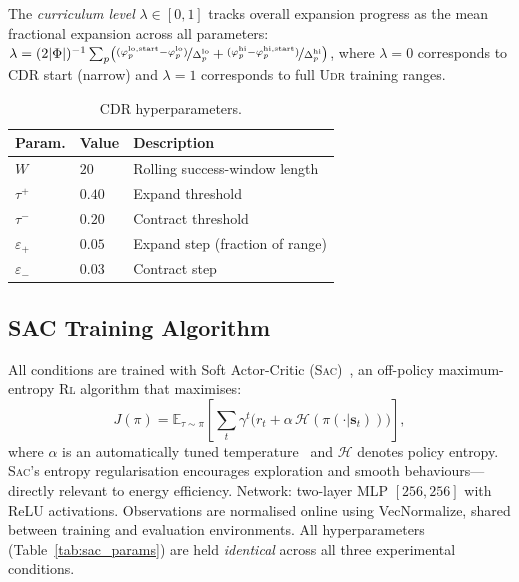 \documentclass[letterpaper,10pt,journal]{IEEEtran}
\newcommand{\UDR}{\textsc{Udr}\xspace}
\newcommand{\SAC}{\textsc{Sac}\xspace}
\newcommand{\RL}{\textsc{Rl}\xspace}
\begin{document}
The \emph{curriculum level} $\lambda\in[0,1]$ tracks overall expansion
progress as the mean fractional expansion across all parameters:
$\lambda = (2|\Phi|)^{-1}\sum_p\bigl(\nicefrac{(\varphi_p^\mathrm{lo,start}
-\varphi_p^\mathrm{lo})}{\Delta_p^\mathrm{lo}}
+\nicefrac{(\varphi_p^\mathrm{hi}-\varphi_p^\mathrm{hi,start})}
{\Delta_p^\mathrm{hi}}\bigr)$,
where $\lambda=0$ corresponds to CDR start (narrow) and $\lambda=1$
corresponds to full \UDR training ranges.

\begin{table}[!t]
  \centering
  \caption{CDR hyperparameters.}
  \label{tab:cdr_params}
  \renewcommand{\arraystretch}{1.15}
  \begin{tabular}{llp{4.0cm}}
    \toprule
    \textbf{Param.} & \textbf{Value} & \textbf{Description} \\
    \midrule
    $W$             & $20$   & Rolling success-window length \\
    $\tau^+$        & $0.40$ & Expand threshold \\
    $\tau^-$        & $0.20$ & Contract threshold \\
    $\varepsilon_+$ & $0.05$ & Expand step (fraction of range) \\
    $\varepsilon_-$ & $0.03$ & Contract step \\
    \bottomrule
  \end{tabular}
\end{table}

\subsection{SAC Training Algorithm}

All conditions are trained with Soft Actor-Critic (\SAC)~\cite{haarnoja2018},
an off-policy maximum-entropy \RL algorithm that maximises:
\begin{equation}
  J(\pi)=\mathbb{E}_{\tau\sim\pi}\!\left[
    \sum_t\gamma^t\bigl(r_t+\alpha\,\mathcal{H}(\pi(\cdot|\mathbf{s}_t))\bigr)
  \right],
  \label{eq:sac}
\end{equation}
where $\alpha$ is an automatically tuned temperature~\cite{haarnoja2018b}
and $\mathcal{H}$ denotes policy entropy.
\SAC's entropy regularisation encourages exploration and smooth
behaviours---directly relevant to energy efficiency.
Network: two-layer MLP $[256,256]$ with ReLU activations.
Observations are normalised online using VecNormalize, shared between
training and evaluation environments.
All hyperparameters (Table~\ref{tab:sac_params}) are held \emph{identical}
across all three experimental conditions.
\end{document}
